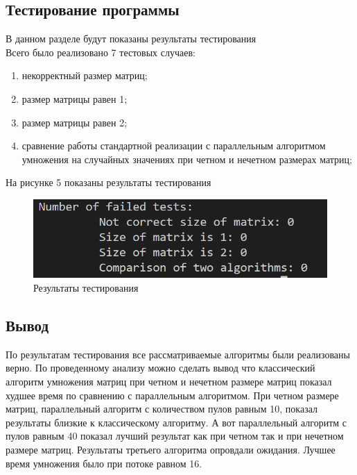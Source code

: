 \documentclass[a4paper, 12pt]{article}
\begin{document}
\begin{flushleft}
	\subsection{Тестирование программы}
	В данном разделе будут показаны результаты тестирования
	\\ \hspace*{5mm} Всего было реализовано 7 тестовых случаев:
	\begin{enumerate}
		\item некорректный размер матриц;
		\item размер матрицы равен 1;
		\item размер матрицы равен 2; 
		\item сравнение работы стандартной реализации с параллельным алгоритмом умножения на случайных значениях при четном и нечетном размерах матриц;
	\end{enumerate}
	\hspace*{5mm} На рисунке 5 показаны результаты тестирования
	\begin{figure}[h]
		\centering \includegraphics[scale=1.2]{tests}
		\centering\caption{Результаты тестирования}
	\end{figure}
	\subsection{Вывод}
	\hspace*{5mm} По результатам тестирования все рассматриваемые алгоритмы были реализованы верно. По проведенному анализу можно сделать вывод что классический алгоритм умножения матриц при четном и нечетном размере матриц показал худшее время по сравнению с параллельным алгоритмом. При четном размере матриц, параллельный алгоритм с количеством пулов равным 10, показал результаты близкие к классическому алгоритму. А вот параллельный алгоритм с пулов равным 40 показал лучший результат как при четном так и при нечетном размере матриц. Результаты третьего алгоритма опровдали ожидания. Лучшее время умножения было при потоке равном 16. 
\end{flushleft}
\end{document}
